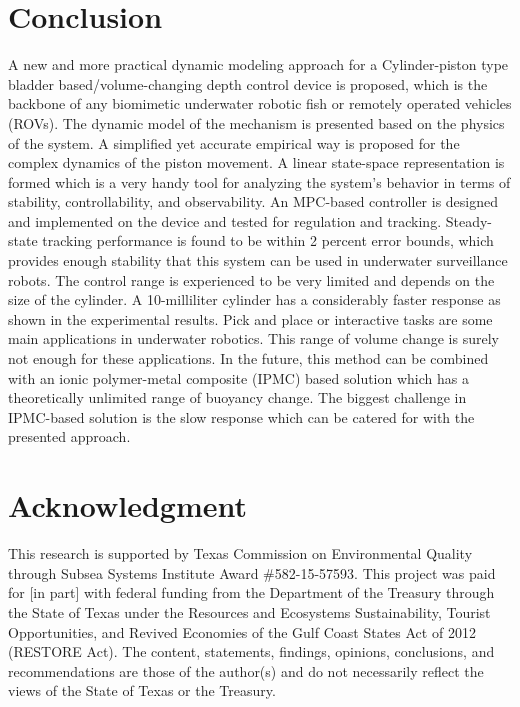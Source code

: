 \documentclass[conference, letterpaper]{IEEEtran}
\begin{document}
\section{Conclusion}
A new and more practical dynamic modeling approach for a Cylinder-piston type bladder based/volume-changing depth control device is proposed, which is the backbone of any biomimetic underwater robotic fish or remotely operated vehicles (ROVs). The dynamic model of the mechanism is presented based on the physics of the system. A simplified yet accurate empirical way is proposed for the complex dynamics of the piston movement. A linear state-space representation is formed which is a very handy tool for analyzing the system's behavior in terms of stability, controllability, and observability.
An MPC-based controller is designed and implemented on the device and tested for regulation and tracking. Steady-state tracking performance is found to be within 2 percent error bounds, which provides enough stability that this system can be used in underwater surveillance robots.
The control range is experienced to be very limited and depends on the size of the cylinder. A 10-milliliter cylinder has a considerably faster response as shown in the experimental results. Pick and place or interactive tasks are some main applications in underwater robotics. This range of volume change is surely not enough for these applications. In the future, this method can be combined with an ionic polymer-metal composite (IPMC) based solution which has a theoretically unlimited range of buoyancy change. The biggest challenge in IPMC-based solution is the slow response which can be catered for with the presented approach.

\section*{Acknowledgment}

This research is supported by Texas Commission on Environmental Quality through Subsea Systems Institute Award \#582-15-57593.  This project was paid for [in part] with federal funding from the Department of the Treasury through the State of Texas under the Resources and Ecosystems Sustainability, Tourist Opportunities, and Revived Economies of the Gulf Coast States Act of 2012 (RESTORE Act).  The content, statements, findings, opinions, conclusions, and recommendations are those of the author(s) and do not necessarily reflect the views of the State of Texas or the Treasury.



\end{document}
